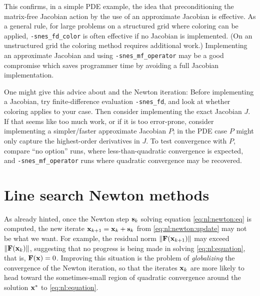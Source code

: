 This confirms, in a simple PDE example, the idea that preconditioning the matrix-free Jacobian action by the use of an approximate Jacobian is effective.  As a general rule, for large problems on a structured grid where coloring can be applied, \texttt{-snes\_fd\_color} is often effective if no Jacobian is implemented.  (On an unstructured grid the coloring method requires additional work.)  Implementing an approximate Jacobian and using \texttt{-snes\_mf\_operator} may be a good compromise which saves programmer time by avoiding a full Jacobian implementation.

One might give this advice about \pSNES and the Newton iteration:  Before implementing a Jacobian, try finite-difference evaluation  \texttt{-snes\_fd}, and look at whether coloring applies to your case.  Then consider implementing the exact Jacobian $J$.  If that seems like too much work, or if it is too error-prone, consider implementing a simpler/faster approximate Jacobian $P$; in the PDE case $P$ might only capture the highest-order derivatives in $J$.  To test convergence with $P$, compare ``no option'' runs, where less-than-quadratic convergence is expected, and \texttt{-snes\_mf\_operator} runs where quadratic convergence may be recovered.


\section{Line search Newton methods} \label{sec:linesearch}

As already hinted, once the Newton step $\mathbf{s}_k$ solving equation \eqref{eq:nl:newton:eq} is computed, the new iterate $\mathbf{x}_{k+1} = \mathbf{x}_k + \mathbf{s}_k$ from \eqref{eq:nl:newton:update} may not be what we want.  For example, the residual norm $\|\mathbf{F}(\mathbf{x}_{k+1})\|$ may exceed $\|\mathbf{F}(\mathbf{x}_{k})\|$, suggesting that no progress is being made in solving \eqref{eq:nl:equation}, that is, $\mathbf{F}(\mathbf{x})=0$.  Improving this situation is the problem of \emph{globalizing} the convergence of the Newton iteration, so that the iterates $\mathbf{x}_k$ are more likely to head toward the sometimes-small region of quadratic convergence around the solution $\mathbf{x}^*$ to \eqref{eq:nl:equation}.

